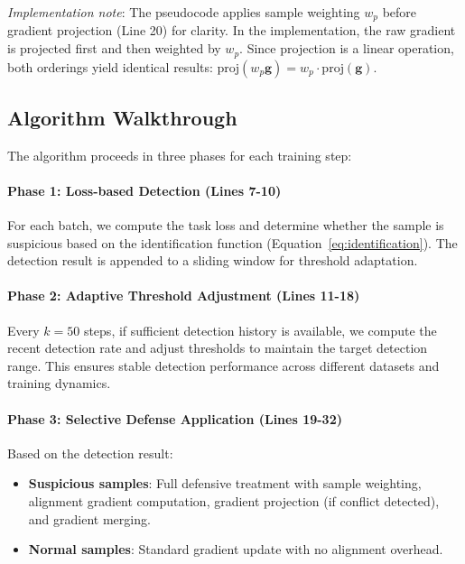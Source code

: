 \textit{Implementation note}: The pseudocode applies sample weighting $w_p$ before gradient projection (Line 20) for clarity. In the implementation, the raw gradient is projected first and then weighted by $w_p$. Since projection is a linear operation, both orderings yield identical results: $\text{proj}(w_p \mathbf{g}) = w_p \cdot \text{proj}(\mathbf{g})$.

\subsection{Algorithm Walkthrough}
\label{subsec:algorithm_walkthrough}

The algorithm proceeds in three phases for each training step:

\paragraph{Phase 1: Loss-based Detection (Lines 7-10)}
For each batch, we compute the task loss and determine whether the sample is suspicious based on the identification function (Equation~\ref{eq:identification}). The detection result is appended to a sliding window for threshold adaptation.

\paragraph{Phase 2: Adaptive Threshold Adjustment (Lines 11-18)}
Every $k=50$ steps, if sufficient detection history is available, we compute the recent detection rate and adjust thresholds to maintain the target detection range. This ensures stable detection performance across different datasets and training dynamics.

\paragraph{Phase 3: Selective Defense Application (Lines 19-32)}
Based on the detection result:
\begin{itemize}
    \item \textbf{Suspicious samples}: Full defensive treatment with sample weighting, alignment gradient computation, gradient projection (if conflict detected), and gradient merging.
    \item \textbf{Normal samples}: Standard gradient update with no alignment overhead.
\end{itemize}


